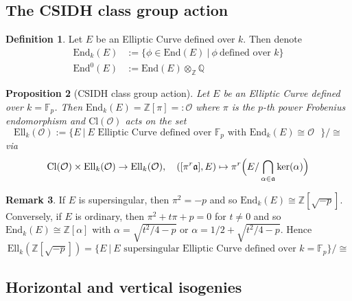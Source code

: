 \documentclass{scrartcl}
\newcommand{\Z}{\mathbb{Z}}
\newcommand{\F}{\mathbb{F}}
\newcommand{\End}{\mathrm{End}}
\newcommand{\Ell}{\mathrm{Ell}}
\newcommand{\Cl}{\mathrm{Cl}}
\newcommand{\Order}{\mathcal{O}}
\newtheorem{prop}{Proposition}[section]
\theoremstyle{definition}
\newtheorem{definition}[prop]{Definition}
\newtheorem{remark}[prop]{Remark}
\begin{document}
\subsection{The CSIDH class group action}

\begin{definition}
    Let $E$ be an Elliptic Curve defined over $k$.
    Then denote
    \begin{align*}
        \End_k(E) &:= \{ \phi \in \End(E) \ | \ \phi \ \text{defined over $k$} \} \\
        \End^0(E) &:= \End(E) \otimes_{\Z} {\mathbb{Q}}
    \end{align*}
\end{definition}
\begin{prop}[CSIDH class group action]
    Let $E$ be an Elliptic Curve defined over $k = \F_p$.
    Then $\End_k(E) = \Z[\pi] =: \Order$ where $\pi$ is the $p$-th power Frobenius endomorphism and $\Cl(\Order)$ acts on the set
    \begin{equation*}
        \Ell_k(\Order) := \{ E \ | \ \text{$E$ Elliptic Curve defined over $\F_p$ with $\End_k(E) \cong \Order$ }\} / \cong
    \end{equation*}
    via
    \begin{equation*}
        \Cl(\Order) \times \Ell_k(\Order) \to \Ell_k(\Order), \quad ([\pi^r\mathfrak{a}], E) \mapsto \pi^r\Bigl( E / \bigcap_{\alpha \in \mathfrak{a}} \ker(\alpha) \Bigr)
    \end{equation*}
\end{prop}
\begin{remark}
    If $E$ is supersingular, then $\pi^2 = -p$ and so $\End_k(E) \cong \Z[\sqrt{-p}]$.
    Conversely, if $E$ is ordinary, then $\pi^2 + t \pi + p = 0$ for $t \neq 0$ and so $\End_k(E) \cong \Z[\alpha]$ with $\alpha = \sqrt{t^2/4 - p}$ or $\alpha = 1/2 + \sqrt{t^2/4 - p}$.
    Hence
    \begin{equation*}
        \Ell_k(\Z[\sqrt{-p}]) = \{ E \ | \ \text{$E$ supersingular Elliptic Curve defined over $k = \F_p$} \} / \cong
    \end{equation*}
\end{remark}

\subsection{Horizontal and vertical isogenies}
\end{document}
